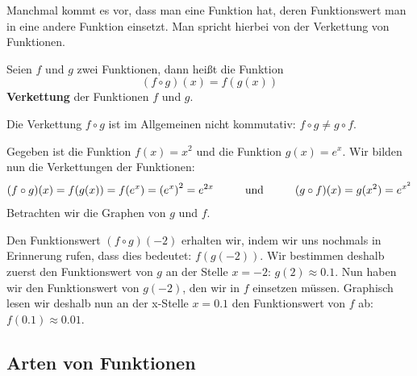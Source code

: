 \documentclass[ngerman, 12pt]{nssheetxea}
\begin{document}
Manchmal kommt es vor, dass man eine Funktion hat, deren Funktionswert man in eine andere Funktion einsetzt. Man spricht hierbei von der Verkettung von Funktionen.

\begin{definition}
Seien $f$ und $g$ zwei Funktionen, dann heißt die Funktion
\[ (f\circ g)(x) = f(g(x))\]
\textbf{Verkettung} der Funktionen $f$ und $g$.  
\end{definition}

\begin{theorem}
Die Verkettung $f\circ g$ ist im Allgemeinen nicht kommutativ: $f\circ g \neq g \circ f$.
\end{theorem}

\begin{example}
Gegeben ist die Funktion $f(x)=x^2$ und die Funktion $g(x)=e^x$. Wir bilden nun die Verkettungen der Funktionen:
\[ (f\circ g)(x)= f(g(x))=f(e^x) = \mleft( e^x \mright)^2 = e^{2x} \hspace{1cm} \text{und} \hspace{1cm} (g\circ f)(x)= g(x^2)=e^{x^2} \]
Betrachten wir die Graphen von $g$ und $f$.
\begin{center}
\end{center}
Den Funktionswert $(f\circ g)(-2)$ erhalten wir, indem wir uns nochmals in Erinnerung rufen, dass dies bedeutet: $f(g(-2))$. Wir bestimmen deshalb zuerst den Funktionswert von $g$ an der Stelle $x=-2$: $g(2) \approx \num{0,1}$. Nun haben wir den Funktionswert von $g(-2)$, den wir in $f$ einsetzen müssen. Graphisch lesen wir deshalb nun an der x-Stelle $x=\num{0,1}$ den Funktionswert von $f$ ab: $f(\num{0,1})\approx \num{0,01}$. 
\end{example}
\newpage

\subsection{Arten von Funktionen}
\end{document}

